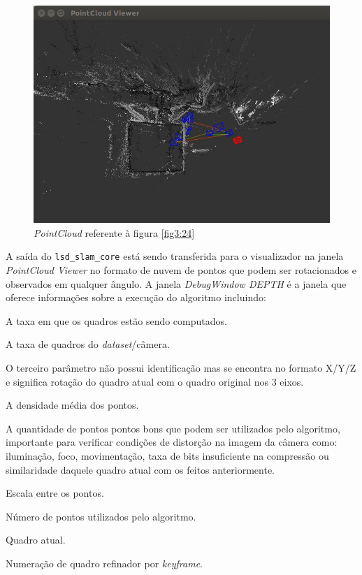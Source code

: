 \begin{figure}[H]
	\centering
		\includegraphics[width= \textwidth]{Imagens/figura3-25.jpg}
	\caption{\textit{PointCloud} referente à figura \ref{fig3:24}}
	\label{fig3:25}
\end{figure}

A saída do \texttt{lsd\_slam\_core} está sendo transferida para o visualizador na janela \textit{PointCloud Viewer} no formato de nuvem de pontos que podem ser rotacionados e observados em qualquer ângulo. A janela \textit{DebugWindow DEPTH} é a janela que oferece informações sobre a execução do algoritmo incluindo:

\begin{description}
	\item[Map upd :]{A taxa em que os quadros estão sendo computados.}
	\item[Trk :]{A taxa de quadros do \textit{dataset}/câmera.}
	\item[X/Y/Z :]{O terceiro parâmetro não possui identificação mas se encontra no formato X/Y/Z e significa rotação do quadro atual com o quadro original nos 3 eixos.}
	\item[Dens X\% :]{A densidade média dos pontos.}
	\item[Good X\% :]{ A quantidade de pontos pontos bons que podem ser utilizados pelo algoritmo, importante para verificar condições de distorção na imagem da câmera como: iluminação, foco, movimentação, taxa de bits insuficiente na compressão ou similaridade daquele quadro atual com os feitos anteriormente.}
	\item[Scale X\% :]{Escala entre os pontos.}
	\item{Número de pontos utilizados pelo algoritmo.}
	\item{Quadro atual.}
	\item{Numeração de quadro refinador por \textit{keyframe}.}
\end{description}

